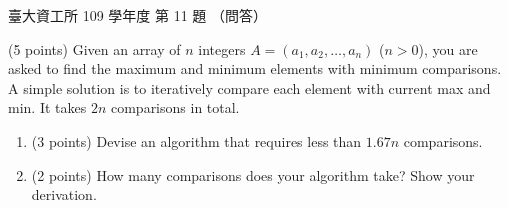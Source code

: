 \begin{pastexam}[label={px:ntu-109-dsaa-11}]{臺大資工所 109 學年度 第 11 題}
（問答）

(5 points) Given an array of $n$ integers $A=(a_1,a_2,\ldots,a_n)$ ($n>0$), you are asked to find
the maximum and minimum elements with minimum comparisons. A simple solution is to iteratively
compare each element with current max and min. It takes $2n$ comparisons in total.
\begin{enumerate}[label=(\alph*)]
\item (3 points) Devise an algorithm that requires less than $1.67n$ comparisons.
\item (2 points) How many comparisons does your algorithm take? Show your derivation.
\end{enumerate}
\end{pastexam}

